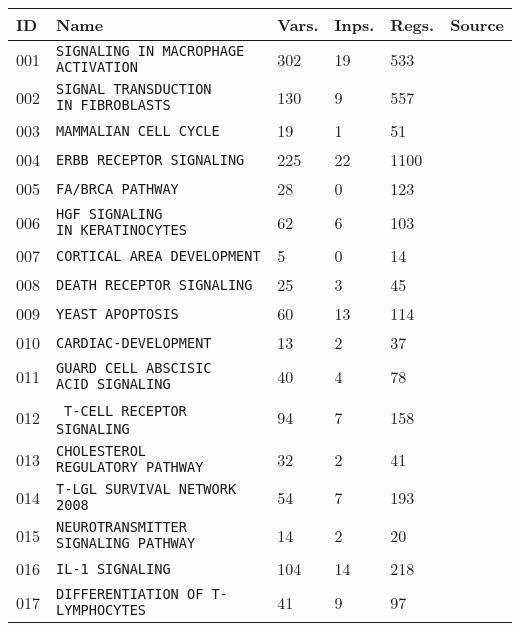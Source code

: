 \documentclass{article}
\begin{document}
\begin{center}
	\begin{tabular}{ | C{16pt} | C{144pt} | C{25pt} | C{25pt} | C{25pt} | C{36pt} | }
		\hline
		ID & Name & Vars. & Inps. & Regs. & Source \\  & \texttt{SIGNALING IN MACROPHAGE ACTIVATION} & 302 & 19 & 533 & \cite{bbm-001, cell-collective} \\  & \texttt{SIGNAL TRANSDUCTION IN~FIBROBLASTS} & 130 & 9 & 557 & \cite{bbm-002, cell-collective} \\  & \texttt{MAMMALIAN CELL CYCLE} & 19 & 1 & 51 & \cite{bbm-003, cell-collective} \\  & \texttt{ERBB RECEPTOR SIGNALING} & 225 & 22 & 1100 & \cite{bbm-004, cell-collective}  \\  & \texttt{FA/BRCA PATHWAY} & 28 & 0 & 123 & \cite{bbm-005, cell-collective} \\  & \texttt{HGF SIGNALING IN~KERATINOCYTES} & 62 & 6 & 103 & \cite{bbm-006, cell-collective} \\  & \texttt{CORTICAL AREA DEVELOPMENT} & 5 & 0 & 14 & \cite{bbm-007, cell-collective} \\  & \texttt{DEATH RECEPTOR SIGNALING} & 25 & 3 & 45 & \cite{bbm-008-150, cell-collective} \\  & \texttt{YEAST APOPTOSIS} & 60 & 13 & 114 & \cite{bbm-009, cell-collective} \\  & \texttt{CARDIAC-DEVELOPMENT} & 13 & 2 & 37 & \cite{bbm-010, cell-collective} \\  & \texttt{GUARD CELL ABSCISIC ACID~SIGNALING} & 40 & 4 & 78 & \cite{bbm-011, cell-collective} \\  & \texttt{T-CELL RECEPTOR SIGNALING} & 94 & 7 & 158 & \cite{bbm-012, cell-collective} \\  & \texttt{CHOLESTEROL REGULATORY~PATHWAY} & 32 & 2 & 41 & \cite{bbm-013, cell-collective} \\  & \texttt{T-LGL SURVIVAL NETWORK 2008} & 54 & 7 & 193 & \cite{bbm-014, cell-collective} \\  & \texttt{NEUROTRANSMITTER SIGNALING~PATHWAY} & 14 & 2 & 20 & \cite{bbm-015, cell-collective} \\  & \texttt{IL-1 SIGNALING} & 104 & 14 & 218 & \cite{bbm-016-019, cell-collective} \\  & \texttt{DIFFERENTIATION OF T-LYMPHOCYTES}  & 41 & 9 & 97 & \cite{bbm-017, cell-collective} \\ \hline

\end{tabular}
\end{center}
\end{document}
